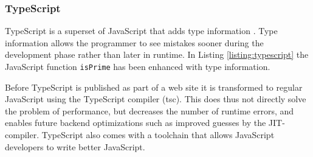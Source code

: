 







\subsubsection{TypeScript}

TypeScript is a superset of JavaScript that adds type information \parencite{DeWolffHage2017}. Type information allows the programmer to see mistakes sooner during the development phase rather than later in runtime. In Listing \ref{listing:typescript} the JavaScript function \texttt{isPrime} has been enhanced with type information.



Before TypeScript is published as part of a web site it is transformed to regular JavaScript using the TypeScript compiler (tsc). This does thus not directly solve the problem of performance, but decreases the number of runtime errors, and enables future backend optimizations such as improved guesses by the JIT-compiler. TypeScript also comes with a toolchain that allows JavaScript developers to write better JavaScript.


